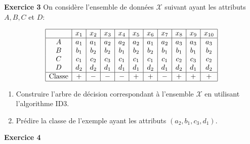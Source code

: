 \documentclass[a4paper,14pt]{article}
\begin{document}
    \vspace{1cm}
    \noindent
    \textbf{Exercice 3}
    On considère l'ensemble de données \(\mathcal{X}\) suivant ayant les attributs \(A, B, C\) et \(D\):
    
    \[
    \begin{array}{|c|*{10}{c|}}
    \hline
     & x_1 & x_2 & x_3 & x_4 & x_5 & x_6 & x_7 & x_8 & x_9 & x_{10} \\
    \hline
    A & a_1 & a_1 & a_2 & a_2 & a_2 & a_1 & a_2 & a_3 & a_3 & a_3 \\
    B & b_1 & b_2 & b_2 & b_1 & b_2 & b_2 & b_1 & b_1 & b_1 & b_2 \\
    C & c_1 & c_2 & c_3 & c_1 & c_1 & c_1 & c_1 & c_2 & c_3 & c_2 \\
    D & d_2 & d_2 & d_1 & d_1 & d_1 & d_2 & d_1 & d_2 & d_1 & d_2 \\
    \hline
    \text{Classe} & + & - & - & - & + & + & - & + & + & + \\
    \hline
    \end{array}
    \]
    
    \begin{enumerate}[label=(\alph*)]
        \item Construire l'arbre de décision correspondant à l'ensemble \(\mathcal{X}\) en utilisant l'algorithme ID3.
        
        \item Prédire la classe de l'exemple ayant les attributs \((a_2, b_1, c_3, d_1)\).
    \end{enumerate}

    \vspace{1cm}
    \noindent
    \textbf{Exercice 4}
    
\end{document}
